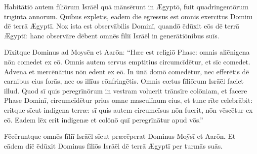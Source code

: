 Habitātiō
autem fīliōrum Isrāēl quā mānsērunt in Ægyptō, fuit quadringentōrum
trīgintā annōrum. Quibus explētīs, eādem diē
ēgressus est omnis exercitus Dominī dē terrā Ægyptī. Nox ista est
observābilis Dominī, quandō ēdūxit eōs dē terrā Ægyptī: hanc
observāre dēbent omnēs fīliī Isrāēl in generātiōnibus suīs.

Dīxitque Dominus ad Moysēn et Aarōn: ``Hæc est religiō Phase: omnis
aliēnigena nōn comedet ex eō. Omnis autem servus
emptitius circumcīdētur, et sīc comedet. Advena et
mercēnārius nōn edent ex eō. In ūnā domō comedētur, nec
efferētis dē carnibus eius forās, nec os illīus
cōnfringētis. Omnis cœtus fīliōrum
Isrāēl faciet illud. Quod sī quis peregrīnōrum in
vestram voluerit trānsīre colōniam, et facere Phase Dominī,
circumcīdētur prius omne masculīnum eius, et tunc rīte
celebrābit: eritque sīcut indigena terræ:
sī quis autem circumcīsus nōn fuerit, nōn
vēscētur ex eō. Eadem lēx erit indigenæ
et colōnō quī peregrīnātur apud vōs.''

Fēcēruntque omnēs
fīliī Isrāēl sīcut præcēperat Dominus Moȳsī et Aarōn. Et eādem diē
ēdūxit Dominus fīliōs Isrāēl dē terrā Ægyptī per turmās
suās. 
